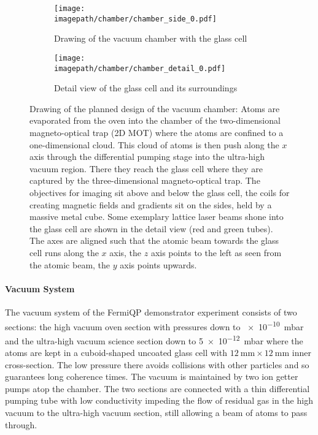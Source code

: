 \begin{figure}
    \centering
    \begin{subfigure}[t]{0.64\textwidth}
        \centering
        \texttt{[image: \\imagepath/chamber/chamber\_side\_0.pdf]}
        \caption{Drawing of the vacuum chamber with the glass cell}
        \label{fig:chamber_coarse}
    \end{subfigure}
    \begin{subfigure}[t]{0.34\textwidth}
        \centering
        \texttt{[image: \\imagepath/chamber/chamber\_detail\_0.pdf]}
        \caption{Detail view of the glass cell and its surroundings}
        \label{fig:chamber_detail}
    \end{subfigure}
    \caption{Drawing of the planned design of the vacuum chamber: Atoms are evaporated from the oven into the chamber of the two-dimensional magneto-optical trap (2D MOT) where the atoms are confined to a one-dimensional cloud. This cloud of atoms is then push along the $x$ axis through the differential pumping stage into the ultra-high vacuum region. There they reach the glass cell where they are captured by the three-dimensional magneto-optical trap. The objectives for imaging sit above and below the glass cell, the coils for creating magnetic fields and gradients sit on the sides, held by a massive metal cube. Some exemplary lattice laser beams shone into the glass cell are shown in the detail view (red and green tubes). The axes are aligned such that the atomic beam towards the glass cell runs along the $x$ axis, the $z$ axis points to the left as seen from the atomic beam, the $y$ axis points upwards.}  
    \label{fig:chamber}
\end{figure}

\paragraph{Vacuum System}
The vacuum system of the FermiQP demonstrator experiment consists of two sections: the high vacuum oven section with pressures down to \SI[]{e-10}{\milli\bar} and the ultra-high vacuum science section down to \SI[]{5e-12}{\milli\bar} where the atoms are kept in a cuboid-shaped uncoated glass cell  with $\SI[]{12}{\milli\meter} \times \SI[]{12}{\milli\meter}$ inner cross-section. The low pressure there avoids collisions with other particles and so guarantees long coherence times. The vacuum is maintained by two ion getter pumps atop the chamber. The two sections are connected with a thin differential pumping tube with low conductivity impeding the flow of residual gas in the high vacuum to the ultra-high vacuum section, still allowing a beam of atoms to pass through.

